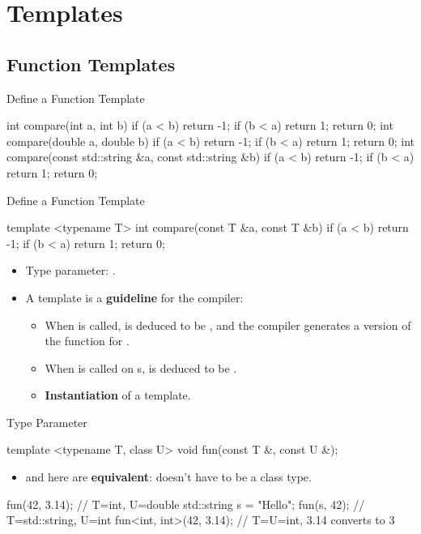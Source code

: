 \section{Templates}

\subsection{Function Templates}

\begin{frame}[fragile]{Define a Function Template}
    \begin{cpp}
int compare(int a, int b) {
  if (a < b) return -1;
  if (b < a) return 1;
  return 0;
}
int compare(double a, double b) {
  if (a < b) return -1;
  if (b < a) return 1;
  return 0;
}
int compare(const std::string &a, const std::string &b) {
  if (a < b) return -1;
  if (b < a) return 1;
  return 0;
}
    \end{cpp}
\end{frame}

\begin{frame}[fragile]{Define a Function Template}
    \begin{cpp}
template <typename T>
int compare(const T &a, const T &b) {
  if (a < b) return -1;
  if (b < a) return 1;
  return 0;
}
    \end{cpp}
    \begin{itemize}
        \item Type parameter: .
        \item A template is a \textbf{guideline} for the compiler:
        \begin{itemize}
            \item When  is called,  is deduced to be , and the compiler generates a version of the function for .
            \item When  is called on s,  is deduced to be .
            \item \textbf{Instantiation} of a template.
        \end{itemize}
    \end{itemize}
\end{frame}

\begin{frame}[fragile]{Type Parameter}
    \begin{cpp}
template <typename T, class U>
void fun(const T &, const U &);
    \end{cpp}
    \begin{itemize}
        \item \typename and \class here are \textbf{equivalent}:  doesn't have to be a class type.
    \end{itemize}
    \pause
    \begin{cpp}
fun(42, 3.14);  // T=int, U=double
std::string s = "Hello";
fun(s, 42);     // T=std::string, U=int
fun<int, int>(42, 3.14); // T=U=int, 3.14 converts to 3
    \end{cpp}
\end{frame}

